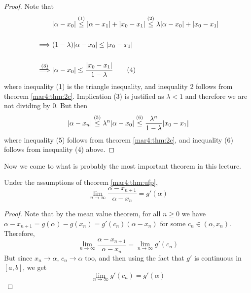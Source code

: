 \begin{proof}
	Note that
	\begin{align*}
		                  & \abs{\alpha - x_0}
		\lao[\leq]{1} \abs{\alpha - x_1} + \abs{x_0 - x_1}
		\lao[\leq]{2} \lambda\abs{\alpha - x_0} + \abs{x_0 - x_1} \\\\
		\implies          &
		(1-\lambda)\abs{\alpha - x_0}
		\leq
		\abs{x_0 - x_1}                                           \\\\
		\lao[\implies]{3} &
		\abs{\alpha - x_0}
		\leq
		\frac{\abs{x_0 - x_1}}{1-\lambda} \tag{4}
	\end{align*}
	where inequality (1) is the triangle inequality, and inequality 2 follows from theorem \ref{mar4:thm:2c}. Implication (3) is justified as $\lambda < 1$ and therefore we are not dividing by 0. But then
	\[
		\abs{\alpha - x_n}
		\lao[\leq]{5}
		\lambda^n\abs{\alpha - x_0}
		\lao[\leq]{6}
		\frac{\lambda^n}{1-\lambda}\abs{x_0 - x_1}
	\]
	where inequality (5) follows from theorem \ref{mar4:thm:2c}, and inequality (6) follows from inequality (4) above.

	\hfill
\end{proof}
Now we come to what is probably the most important theorem in this lecture.
\begin{thm}
	Under the assumptions of theorem \ref{mar4:thm:ufp},
	\label{mar4:thm:bigtp}
	\[
		\lim_{n\to\infty} \frac{\alpha - x_{n+1}}{\alpha - x_n} = g'(\alpha)
	\]
\end{thm}
\begin{proof}
	Note that by the mean value theorem, for all $n \geq 0$ we have $\alpha - x_{n+1} = g(\alpha) - g(x_n) = g'(c_n)(\alpha - x_n)$ for some $c_n \in (\alpha, x_n)$. Therefore,
	\[
		\lim_{n\to\infty} \frac{\alpha - x_{n+1}}{\alpha - x_n} = \lim_{n\to\infty} g'(c_n)
	\]
	But since $x_n \to \alpha$, $c_n \to \alpha$ too, and then using the fact that $g'$ is continuous in $[a, b]$, we get
	\[
		\lim_{n\to\infty} g'(c_n) = g'(\alpha)
	\]
	\hfill
\end{proof}

